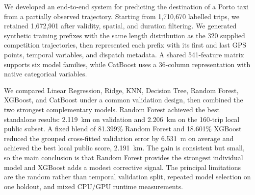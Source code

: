 We developed an end-to-end system for predicting the destination of a Porto taxi from a partially observed trajectory.  Starting from 1,710,670 labelled trips, we retained 1,672,901 after validity, spatial, and duration filtering.  We generated synthetic training prefixes with the same length distribution as the 320 supplied competition trajectories, then represented each prefix with its first and last GPS points, temporal variables, and dispatch metadata.  A shared 541-feature matrix supports six model families, while CatBoost uses a 36-column representation with native categorical variables.

We compared Linear Regression, Ridge, KNN, Decision Tree, Random Forest, XGBoost, and CatBoost under a common validation design, then combined the two strongest complementary models.  Random Forest achieved the best standalone results: 2.119~km on validation and 2.206~km on the 160-trip local public subset.  A fixed blend of 81.399\% Random Forest and 18.601\% XGBoost reduced the grouped cross-fitted validation error by 6.531~m on average and achieved the best local public score, 2.191~km.  The gain is consistent but small, so the main conclusion is that Random Forest provides the strongest individual model and XGBoost adds a modest corrective signal.  The principal limitations are the random rather than temporal validation split, repeated model selection on one holdout, and mixed CPU/GPU runtime measurements.
